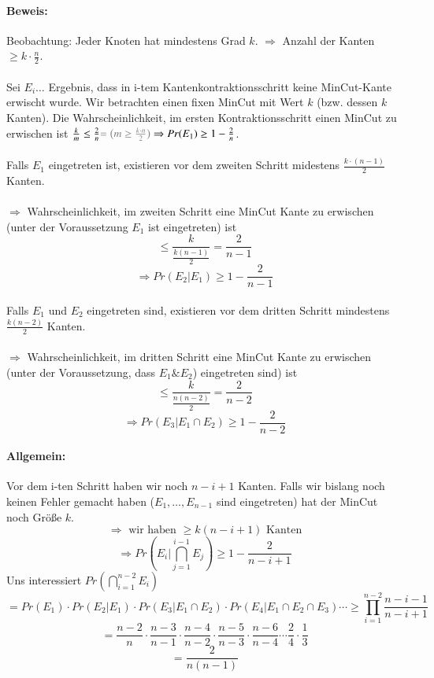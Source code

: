 \paragraph*{Beweis:} Beobachtung: Jeder Knoten hat mindestens Grad $k$. $\Rightarrow$ Anzahl der Kanten $\geq k \cdot \frac{n}{2}$.

\paragraph*{} Sei $E_i \dots$ Ergebnis, dass in i-tem Kantenkontraktionsschritt keine MinCut-Kante erwischt wurde. Wir betrachten einen fixen MinCut mit Wert $k$ (bzw. dessen $k$ Kanten). Die Wahrscheinlichkeit, im ersten Kontraktionsschritt einen MinCut zu erwischen ist $\frac{k}{m} \leq \frac{2}{n} \textcolor{gray}{= \big( m \geq \frac{k \cdot n}{2} \big)} \Rightarrow Pr(E_1) \geq 1-\frac{2}{n}$.
\paragraph*{} Falls $E_1$ eingetreten ist, existieren vor dem zweiten Schritt midestens $\frac{k \cdot (n-1)}{2}$ Kanten.
\paragraph*{} $\Rightarrow$ Wahrscheinlichkeit, im zweiten Schritt eine MinCut Kante zu erwischen (unter der Voraussetzung $E_1$ ist eingetreten) ist
$$ \leq \frac{k}{\frac{k(n-1)}{2}} = \frac{2}{n-1}$$
$$ \Rightarrow Pr(E_2|E_1) \geq 1 - \frac{2}{n-1} $$
\paragraph*{} Falls $E_1$ und $E_2$ eingetreten sind, existieren vor dem dritten Schritt mindestens $\frac{k(n-2)}{2}$ Kanten.
\paragraph*{} $\Rightarrow$ Wahrscheinlichkeit, im dritten Schritt eine MinCut Kante zu erwischen (unter der Voraussetzung, dass $E_1 \& E_2$) eingetreten sind) ist
$$ \leq \frac{k}{\frac{n(n-2)}{2}} = \frac{2}{n-2} $$
$$ \Rightarrow Pr(E_3|E_1 \cap E_2) \geq 1 - \frac{2}{n-2} $$

\paragraph*{Allgemein:} Vor dem i-ten Schritt haben wir noch $n-i+1$ Kanten. Falls wir bislang  noch keinen Fehler gemacht haben ($E_1,\dots, E_{n-1}$ sind eingetreten) hat der MinCut noch Größe $k$.
$$ \Rightarrow \text{ wir haben } \geq k(n-i+1) \text{ Kanten} $$
$$ \Rightarrow Pr(E_i|\bigcap_{j=1}^{i-1} E_j) \geq 1-\frac{2}{n-i+1} $$
Uns interessiert $Pr(\bigcap\limits_{i=1}^{n-2} E_i)$
$$ = Pr(E_1) \cdot Pr(E_2|E_1) \cdot Pr(E_3|E_1 \cap E_2) \cdot Pr(E_4|E_1 \cap E_2 \cap E_3) \cdots \geq \prod\limits_{i=1}^{n-2} \frac{n-i-1}{n-i+1} $$
$$ = \frac{n-2}{n} \cdot \frac{n-3}{n-1} \cdot \frac{n-4}{n-2} \cdot \frac{n-5}{n-3} \cdot \frac{n-6}{n-4} \cdots \frac{2}{4} \cdot \frac{1}{3} $$
$$ = \frac{2}{n(n-1)} $$

